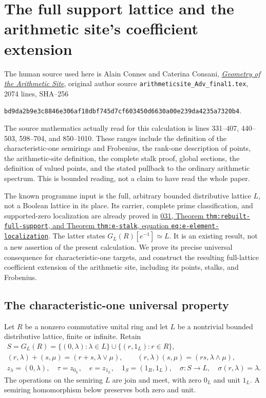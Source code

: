 \section{The full support lattice and the arithmetic site's coefficient extension}
\label{sec:arithmetic-site-lattice-map}

The human source used here is Alain Connes and Caterina Consani,
\href{https://arxiv.org/abs/1502.05580}{\emph{Geometry of the Arithmetic
Site}}, original author source \nolinkurl{arithmeticsite_Adv_final1.tex},
2074 lines, SHA--256
\par\noindent
\nolinkurl{bd9da2b9e3c8846e306af18dbf745d7cf603450d6630a00e239da4235a7320b4}.
\par\noindent
The source mathematics actually read for this calculation is lines
331--407, 440--503, 598--704, and 850--1010. These ranges include the
definition of the characteristic-one semirings and Frobenius,
the rank-one description of points, the arithmetic-site definition,
the complete stalk proof, global sections, the definition of valued
points, and the stated pullback to the ordinary arithmetic spectrum.
This is bounded reading, not a claim to have read the whole paper.

The known programme input is the full, arbitrary bounded distributive
lattice $L$, not a Boolean lattice in its place. Its carrier, complete
prime classification, and supported-zero localization are already proved
in
\href{https://github.com/KokunoYumeto/zeta-function-research-reader/blob/3c78cfbd9e194d35117b33277c421c6564ce3dbf/workbenches/splitzero-tandem/continuations/20260923-full-prime-support/031/01_REBUILT_MATHEMATICS.tex}{031,
Theorem \texttt{thm:rebuilt-full-support}, and Theorem
\texttt{thm:e-stalk}, equation \texttt{eq:e-element-localization}}.
The latter states $G_L(R)[e^{-1}]\simeq L$. It is an existing result,
not a new assertion of the present calculation. We prove its precise
universal consequence for characteristic-one targets, and construct
the resulting full-lattice coefficient extension of the arithmetic
site, including its points, stalks, and Frobenius.

\subsection{The characteristic-one universal property}

Let $R$ be a nonzero commutative unital ring and let $L$ be a nontrivial
bounded distributive lattice, finite or infinite. Retain
\begin{equation}\tag{ASL1}
 \begin{gathered}
 S=G_L(R)=\{(0,\lambda):\lambda\in L\}
                  \cup\{(r,1_L):r\in R\},\\
 (r,\lambda)+(s,\mu)=(r+s,\lambda\vee\mu),\qquad
 (r,\lambda)(s,\mu)=(rs,\lambda\wedge\mu),\\
 z_\lambda=(0,\lambda),\quad \tau=z_{0_L},\quad e=z_{1_L},
 \quad 1_S=(1_R,1_L),\quad
 \sigma:S\longrightarrow L,\quad \sigma(r,\lambda)=\lambda.
 \end{gathered}
\end{equation}
The operations on the semiring $L$ are join and meet, with zero $0_L$
and unit $1_L$. A semiring homomorphism below preserves both zero and
unit.

